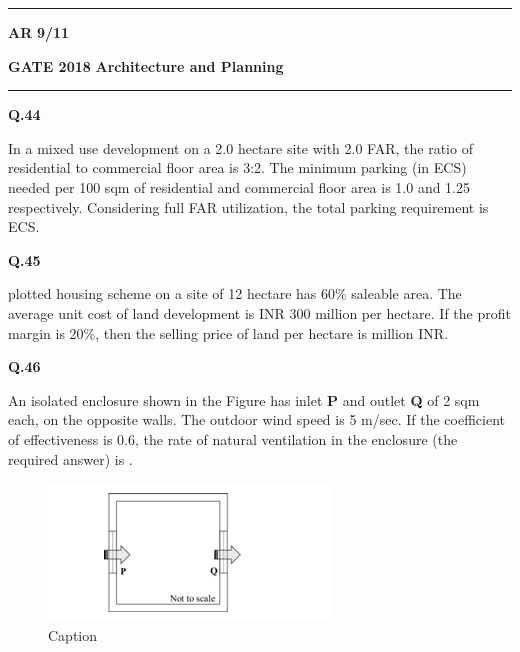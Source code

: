 \documentclass[journal,12pt,onecolumn]{IEEEtran}
\theoremstyle{remark}
\begin{document}
\vspace{0.5cm}
 \noindent
\hrule \vspace{0.0875CM} \textbf{AR} \hfill  \textbf{9/11}

\newpage

\noindent
\textbf{GATE 2018} \hfill \textbf{Architecture and Planning}
\vspace{0.0012cm} \hrule

\vspace{1.2cm}
\noindent 
\textbf{Q.44} \hspace{0.35cm} \parbox[t]{14.5cm}{In a mixed use development on a 2.0 hectare site with 2.0 FAR, the ratio of residential to commercial floor area is 3:2. The minimum parking (in ECS) needed per 100 sqm of residential and commercial floor area is 1.0 and 1.25 respectively. Considering full FAR utilization, the total parking requirement is \underline{\hspace{3cm}} ECS.}

\vspace{1cm}

\noindent
\textbf{Q.45} \hspace{0.35cm}\parbox[t]{14.5cm}{ plotted housing scheme on a site of 12 hectare has 60\% saleable area. The average unit cost of land development is INR 300 million per hectare. If the profit margin is 20\%, then the selling price of land per hectare is \underline{\hspace{3cm}} million INR.}

\vspace{1cm}

\noindent
\textbf{Q.46}\hspace{0.35cm} \parbox[t]{14.5cm}{ An isolated enclosure shown in the Figure has inlet \textbf{P} and outlet \textbf{Q} of 2 sqm each, on the opposite walls. The outdoor wind speed is 5 m/sec. If the coefficient of effectiveness is 0.6, the rate of natural ventilation in the enclosure (the required answer) is \underline{\hspace{3cm}}.}
\begin{figure} [h]
    \centering
    \includegraphics[width=0.3\linewidth]{Figs/Screenshot 2025-08-16 142607.png}
    \caption{Caption}
    \label{fig:placeholder}
\end{figure}
\end{document}
